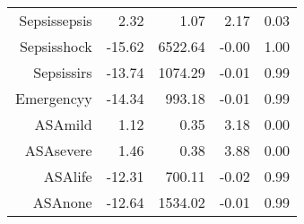 \begin{tabular}{rrrrr}
$$  Sepsis\-sepsis & 2.32 & 1.07 & 2.17 & 0.03 \\ 
  Sepsis\-shock & -15.62 & 6522.64 & -0.00 & 1.00 \\ 
  Sepsis\-sirs & -13.74 & 1074.29 & -0.01 & 0.99 \\ 
  Emergency\-y & -14.34 & 993.18 & -0.01 & 0.99 \\ 
  ASA\-mild & 1.12 & 0.35 & 3.18 & 0.00 \\ 
  ASA\-severe & 1.46 & 0.38 & 3.88 & 0.00 \\ 
  ASA\-life & -12.31 & 700.11 & -0.02 & 0.99 \\ 
  ASA\-none & -12.64 & 1534.02 & -0.01 & 0.99 \\ 
   \hline
\end{tabular}

